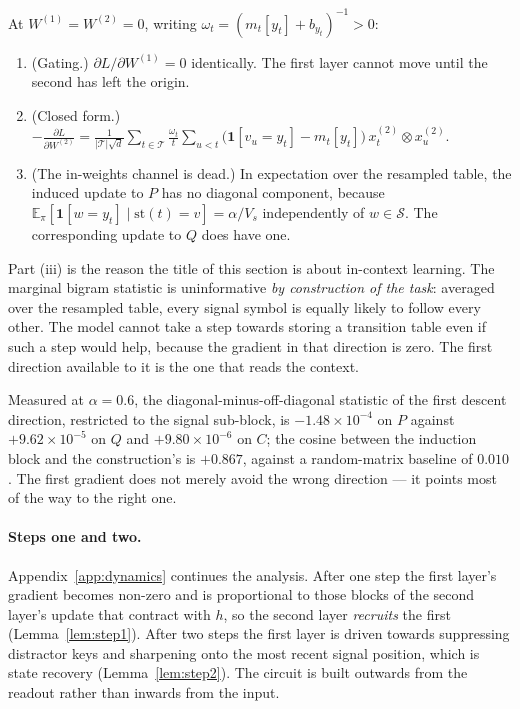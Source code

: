 \begin{theorem}
\label{thm:dynamics}
At $W^{(1)}=W^{(2)}=0$, writing $\omega_t=(m_t[y_t]+b_{y_t})^{-1}>0$:
\begin{enumerate}
\item[(i)] \textup{(Gating.)} $\partial L/\partial W^{(1)}=0$ identically. The first layer cannot
move until the second has left the origin.
\item[(ii)] \textup{(Closed form.)}
$\displaystyle -\frac{\partial L}{\partial W^{(2)}}
=\frac{1}{|\mathcal{T}|\sqrt d}\sum_{t\in\mathcal{T}}\frac{\omega_t}{t}\sum_{u<t}
\bigl(\mathbf 1[v_u=y_t]-m_t[y_t]\bigr)\,x^{(2)}_t\otimes x^{(2)}_u .$
\item[(iii)] \textup{(The in-weights channel is dead.)} In expectation over the resampled table,
the induced update to $P$ has no diagonal component, because
$\mathbb{E}_\pi[\mathbf 1[w=y_t]\mid \mathrm{st}(t)=v]=\alpha/V_s$ independently of
$w\in\mathcal{S}$. The corresponding update to $Q$ does have one.
\end{enumerate}
\end{theorem}

Part (iii) is the reason the title of this section is about in-context learning. The marginal
bigram statistic is uninformative \emph{by construction of the task}: averaged over the resampled
table, every signal symbol is equally likely to follow every other. The model cannot take a step
towards storing a transition table even if such a step would help, because the gradient in that
direction is zero. The first direction available to it is the one that reads the context.

Measured at $\alpha=0.6$, the diagonal-minus-off-diagonal statistic of the first descent
direction, restricted to the signal sub-block, is $-1.48\times10^{-4}$ on $P$ against
$+9.62\times10^{-5}$ on $Q$ and $+9.80\times10^{-6}$ on $C$; the cosine between the induction
block and the construction's is $+0.867$, against a random-matrix baseline of $0.010$. The first
gradient does not merely avoid the wrong direction --- it points most of the way to the right one.

\paragraph{Steps one and two.}
Appendix~\ref{app:dynamics} continues the analysis. After one step the first layer's gradient
becomes non-zero and is proportional to those blocks of the second layer's update that contract
with $h$, so the second layer \emph{recruits} the first
(Lemma~\ref{lem:step1}). After two steps the first layer is driven towards suppressing distractor
keys and sharpening onto the most recent signal position, which is state recovery
(Lemma~\ref{lem:step2}). The circuit is built outwards from the readout rather than inwards from
the input.

